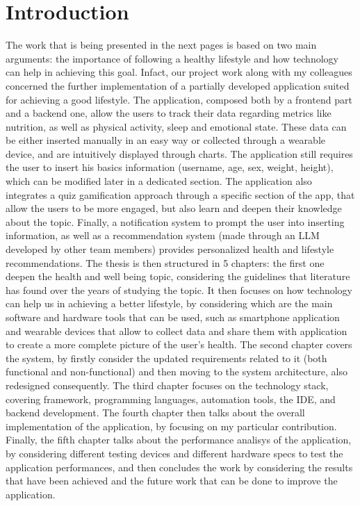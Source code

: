\section*{Introduction}
The work that is being presented in the next pages is based on two main arguments: the importance of following a healthy lifestyle and how technology can help in achieving this goal. Infact, our project work along with my colleagues concerned the further implementation of a partially developed application suited for achieving a good lifestyle. The application, composed both by a frontend part and a backend one, allow the users to track their data regarding metrics like nutrition, as well as physical activity, sleep and emotional state. These data can be either inserted manually in an easy way or collected through a wearable device, and are intuitively displayed through charts. The application still requires the user to insert his basics information (username, age, sex, weight, height), which can be modified later in a dedicated section. The application also integrates a quiz gamification approach through a specific section of the app, that allow the users to be more engaged, but also learn and deepen their knowledge about the topic. Finally, a notification system to prompt the user into inserting information, as well as a recommendation system (made through an LLM developed by other team members) provides personalized health and lifestyle recommendations. The thesis is then structured in 5 chapters: the first one deepen the health and well being topic, considering the guidelines that literature has found over the years of studying the topic. It then focuses on how technology can help us in achieving a better lifestyle, by considering which are the main software and hardware tools that can be used, such as smartphone application and wearable devices that allow to collect data and share them with application to create a more complete picture of the user's health. The second chapter covers the system, by firstly consider the updated requirements related to it (both functional and non-functional) and then moving to the system architecture, also redesigned consequently. The third chapter focuses on the technology stack, covering framework, programming languages, automation tools, the IDE, and backend development. The fourth chapter then talks about the overall implementation of the application, by focusing on my particular contribution. Finally, the fifth chapter talks about the performance analisys of the application, by considering different testing devices and different hardware specs to test the application performances, and then concludes the work by considering the results that have been achieved and the future work that can be done to improve the application.
